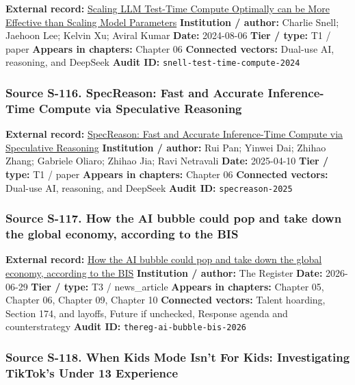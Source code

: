 \documentclass[
  american,
  11pt,
  letterpaper,
]{article}
\begin{document}
\textbf{External record:}
\href{https://arxiv.org/abs/2408.03314}{Scaling LLM Test-Time Compute
Optimally can be More Effective than Scaling Model Parameters}
\textbf{Institution / author:} Charlie Snell; Jaehoon Lee; Kelvin Xu;
Aviral Kumar \textbf{Date:} 2024-08-06 \textbf{Tier / type:} T1 / paper
\textbf{Appears in chapters:} Chapter 06 \textbf{Connected vectors:}
Dual-use AI, reasoning, and DeepSeek \textbf{Audit ID:}
\texttt{snell-test-time-compute-2024}

\subsubsection{Source S-116. SpecReason: Fast and Accurate
Inference-Time Compute via Speculative
Reasoning}\label{source-s-116-specreason-fast-and-accurate-inference-time-compute-via-speculative-reasoning}

\textbf{External record:}
\href{https://arxiv.org/abs/2504.07891}{SpecReason: Fast and Accurate
Inference-Time Compute via Speculative Reasoning} \textbf{Institution /
author:} Rui Pan; Yinwei Dai; Zhihao Zhang; Gabriele Oliaro; Zhihao Jia;
Ravi Netravali \textbf{Date:} 2025-04-10 \textbf{Tier / type:} T1 /
paper \textbf{Appears in chapters:} Chapter 06 \textbf{Connected
vectors:} Dual-use AI, reasoning, and DeepSeek \textbf{Audit ID:}
\texttt{specreason-2025}

\subsubsection{Source S-117. How the AI bubble could pop and take down
the global economy, according to the
BIS}\label{source-s-117-how-the-ai-bubble-could-pop-and-take-down-the-global-economy-according-to-the-bis}

\textbf{External record:}
\href{https://www.theregister.com/ai-and-ml/2026/06/29/how-the-ai-bubble-could-pop-and-take-down-the-global-economy-according-to-the-bis/}{How
the AI bubble could pop and take down the global economy, according to
the BIS} \textbf{Institution / author:} The Register \textbf{Date:}
2026-06-29 \textbf{Tier / type:} T3 / news\_article \textbf{Appears in
chapters:} Chapter 05, Chapter 06, Chapter 09, Chapter 10
\textbf{Connected vectors:} Talent hoarding, Section 174, and layoffs,
Future if unchecked, Response agenda and counterstrategy \textbf{Audit
ID:} \texttt{thereg-ai-bubble-bis-2026}

\subsubsection{Source S-118. When Kids Mode Isn't For Kids:
Investigating TikTok's Under 13
Experience}\label{source-s-118-when-kids-mode-isn-t-for-kids-investigating-tiktok-s-under-13-experience}
\end{document}

